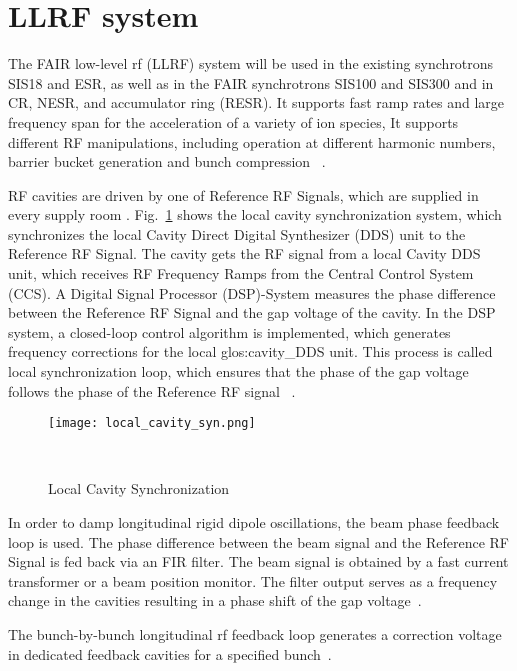 \section{LLRF system}
The FAIR low-level rf (\gls{LLRF}) system will be used in the existing synchrotrons SIS18 and \gls{ESR}, as well as in the FAIR synchrotrons SIS100 and SIS300 and in \gls{CR}, \gls{NESR}, and accumulator ring (\gls{RESR}). It supports fast ramp rates and large frequency span for the acceleration of a variety of ion species, It supports different RF manipulations, including operation at different harmonic numbers, barrier bucket generation and bunch compression ~\cite{klingbeil_new_2011}. 

RF cavities are driven by one of Reference RF Signals, which are supplied in every supply room . Fig.~\ref{local_cavity_syn} shows the local cavity synchronization system, which synchronizes the local Cavity Direct Digital Synthesizer (DDS) unit to the Reference RF Signal. The cavity gets the RF signal from a local Cavity \gls{DDS} unit, which receives RF Frequency Ramps from the Central Control System (\gls{CCS}). A Digital Signal Processor (\gls{DSP})-System measures the phase difference between the Reference RF Signal and the gap voltage of the cavity. In the DSP system, a closed-loop control algorithm is implemented, which generates frequency corrections for the local \gls{glos:cavity_DDS} unit. This process is called local synchronization loop, which ensures that the phase of the gap voltage follows the phase of the Reference RF signal ~\cite{klingbeil_new_2011}. 
\begin{figure}[H]
   \centering   
   \texttt{[image: local\_cavity\_syn.png]}
   \caption{Local Cavity Synchronization}{~\cite{klingbeil_new_2011}}
   \label{local_cavity_syn}
\end{figure}

In order to damp longitudinal rigid dipole oscillations, the beam phase feedback loop is used. The phase difference between the beam signal and the Reference RF Signal is fed back via an FIR filter. The beam signal is obtained by a fast current transformer or a beam position monitor. The filter output serves as a frequency change in the cavities resulting in a phase shift of the gap voltage~\cite{baudrenghien_low-level_2010}. 

The bunch-by-bunch longitudinal rf feedback loop generates a correction voltage in dedicated feedback cavities for a specified bunch~\cite{gross_bunch-by-bunch_2015}.


